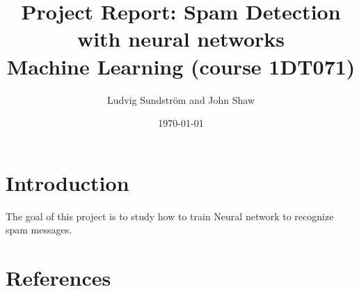 \documentclass[a4paper,11pt]{article}
\title{\textbf{Project Report: Spam Detection with neural networks} \\
    \textbf{Machine Learning (course 1DT071)} \\  
}
\author{Ludvig Sundstr\"{o}m and John Shaw}
\date{\today}
\begin{document}
\maketitle
\newpage
\tableofcontents
\newpage

\section{Introduction} 
  The goal of this project is to study how to train Neural network to recognize
  spam messages.







\section{References}
  
  
\end{document}
